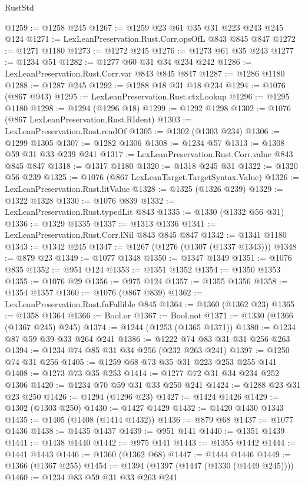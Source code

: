 \begin{lexlean}{RustStd}
\begin{coremodule}
@1259 := @1258 @245
@1267 := @1259 @23 @61 @35 @31 @223 @243 @245 @124
@1271 := LexLeanPreservation.Rust.Corr.opsOfL @843 @845 @847
@1272 := @1271 @1180
@1273 := @1272 @245
@1276 := @1273 @61 @35 @243
@1277 := @1234 @51
@1282 := @1277 @60 @31 @34 @234 @242
@1286 := LexLeanPreservation.Rust.Corr.var @843 @845 @847
@1287 := @1286 @1180
@1288 := @1287 @245
@1292 := @1288 @18 @31 @18 @234
@1294 := @1076 (@867 @943)
@1295 := LexLeanPreservation.Rust.ctxLookup
@1296 := @1295 @1180
@1298 := @1294 (@1296 @18)
@1299 := @1292 @1298
@1302 := @1076 (@867 LexLeanPreservation.Rust.RIdent)
@1303 := LexLeanPreservation.Rust.readOf
@1305 := @1302 (@1303 @234)
@1306 := @1299 @1305
@1307 := @1282 @1306
@1308 := @1234 @57
@1313 := @1308 @59 @31 @33 @239 @241
@1317 := LexLeanPreservation.Rust.Corr.value @843 @845 @847
@1318 := @1317 @1180
@1320 := @1318 @245 @31
@1322 := @1320 @56 @239
@1325 := @1076 (@867 LexLeanTarget.TargetSyntax.Value)
@1326 := LexLeanPreservation.Rust.litValue
@1328 := @1325 (@1326 @239)
@1329 := @1322 @1328
@1330 := @1076 @839
@1332 := LexLeanPreservation.Rust.typedLit @843
@1335 := @1330 (@1332 @56 @31)
@1336 := @1329 @1335
@1337 := @1313 @1336
@1341 := LexLeanPreservation.Rust.Corr.lNil @843 @845 @847
@1342 := @1341 @1180
@1343 := @1342 @245
@1347 := @1267 (@1276 (@1307 (@1337 @1343)))
@1348 := @879 @23
@1349 := @1077 @1348
@1350 := @1347 @1349
@1351 := @1076 @835
@1352 := @951 @124
@1353 := @1351 @1352
@1354 := @1350 @1353
@1355 := @1076 @29
@1356 := @975 @124
@1357 := @1355 @1356
@1358 := @1354 @1357
@1360 := @1076 (@867 @839)
@1362 := LexLeanPreservation.Rust.fnFallible @845
@1364 := @1360 (@1362 @23)
@1365 := @1358 @1364
@1366 := Bool.or
@1367 := Bool.not
@1371 := @1330 (@1366 (@1367 @245) @245)
@1374 := @1244 (@1253 (@1365 @1371))
@1380 := @1234 @87 @59 @39 @33 @264 @241
@1386 := @1222 @74 @83 @31 @31 @256 @263
@1394 := @1234 @74 @85 @31 @34 @256 (@232 @263 @241)
@1397 := @1250 @74 @31 @256
@1405 := @1259 @68 @73 @35 @31 @223 @253 @255 @141
@1408 := @1273 @73 @35 @253
@1414 := @1277 @72 @31 @34 @234 @252 @1306
@1420 := @1234 @70 @59 @31 @33 @250 @241
@1424 := @1288 @23 @31 @23 @250
@1426 := @1294 (@1296 @23)
@1427 := @1424 @1426
@1429 := @1302 (@1303 @250)
@1430 := @1427 @1429
@1432 := @1420 @1430 @1343
@1435 := @1405 (@1408 (@1414 @1432))
@1436 := @879 @68
@1437 := @1077 @1436
@1438 := @1435 @1437
@1439 := @951 @141
@1440 := @1351 @1439
@1441 := @1438 @1440
@1442 := @975 @141
@1443 := @1355 @1442
@1444 := @1441 @1443
@1446 := @1360 (@1362 @68)
@1447 := @1444 @1446
@1449 := @1366 (@1367 @255)
@1454 := @1394 (@1397 (@1447 (@1330 (@1449 @245))))
@1460 := @1234 @83 @59 @31 @33 @263 @241

\end{coremodule}
\end{lexlean}

